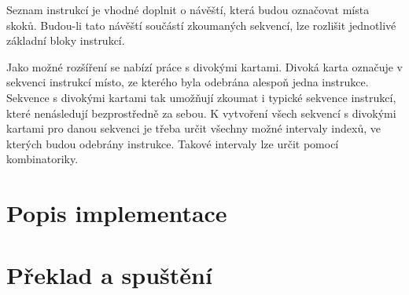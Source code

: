 Seznam instrukcí je vhodné doplnit o návěští, která budou označovat místa skoků. Budou-li tato návěští součástí zkoumaných sekvencí, lze rozlišit jednotlivé základní bloky instrukcí.

Jako možné rozšíření se nabízí práce s divokými kartami.
Divoká karta označuje v sekvenci instrukcí místo, ze kterého byla odebrána alespoň jedna instrukce. Sekvence s divokými kartami tak umožňují zkoumat i typické sekvence instrukcí, které nenásledují bezprostředně za sebou. K vytvoření všech sekvencí s divokými kartami pro danou sekvenci je třeba určit všechny možné intervaly indexů, ve kterých budou odebrány instrukce. Takové intervaly lze určit pomocí kombinatoriky.



\section{Popis implementace}\label{ToolImplementation}


\section{Překlad a spuštění}\label{ToolRun}

